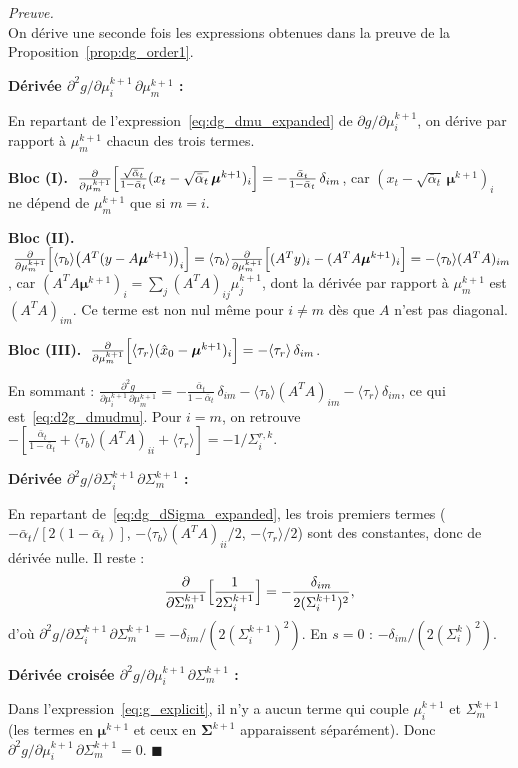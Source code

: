 \documentclass[12pt]{article}
\newcommand{\alt}{\bar\alpha_t}
\renewcommand{\qedsymbol}{$\blacksquare$}
\renewenvironment{proof}[1][\proofname]{%
  \par\medskip\noindent
  \textit{\color{proofgray}#1.}\enspace\ignorespaces
}{\hfill\qedsymbol\par\medskip}
\renewcommand{\proofname}{Preuve}
\begin{document}
\begin{proof}\\
On dérive une seconde fois les expressions obtenues dans la preuve de la Proposition~\ref{prop:dg_order1}.

\medskip
\textbf{Dérivée $\partial^2 g / \partial\mu_i^{k+1}\,\partial\mu_m^{k+1}$ :}

En repartant de l'expression~\eqref{eq:dg_dmu_expanded} de $\partial g/\partial\mu_i^{k+1}$, on dérive par rapport à $\mu_m^{k+1}$ chacun des trois termes.

\medskip

\textbf{Bloc (I).} $\;\frac{\partial}{\partial\mu_m^{k+1}}\Bigl[\frac{\sqrt{\alt}}{1-\alt}(x_t - \sqrt{\alt}\,\boldsymbol{\mu}^{k+1})_i\Bigr] = -\frac{\alt}{1-\alt}\,\delta_{im}$, car $(x_t - \sqrt{\alt}\,\boldsymbol{\mu}^{k+1})_i$ ne dépend de $\mu_m^{k+1}$ que si $m = i$.

\medskip

\textbf{Bloc (II).} $\;\frac{\partial}{\partial\mu_m^{k+1}}\Bigl[\langle\tau_b\rangle\bigl(A^T(y - A\boldsymbol{\mu}^{k+1})\bigr)_i\Bigr] = \langle\tau_b\rangle\frac{\partial}{\partial\mu_m^{k+1}}\Bigl[(A^Ty)_i - (A^TA\boldsymbol{\mu}^{k+1})_i\Bigr] = -\langle\tau_b\rangle(A^TA)_{im}$, car $(A^TA\boldsymbol{\mu}^{k+1})_i = \sum_j(A^TA)_{ij}\mu_j^{k+1}$, dont la dérivée par rapport à $\mu_m^{k+1}$ est $(A^TA)_{im}$. Ce terme est non nul même pour $i \neq m$ dès que $A$ n'est pas diagonal.

\medskip

\textbf{Bloc (III).} $\;\frac{\partial}{\partial\mu_m^{k+1}}\Bigl[\langle\tau_r\rangle(\hat{x}_0 - \boldsymbol{\mu}^{k+1})_i\Bigr] = -\langle\tau_r\rangle\,\delta_{im}$.

\medskip

En sommant : $\frac{\partial^2 g}{\partial\mu_i^{k+1}\,\partial\mu_m^{k+1}} = -\frac{\alt}{1-\alt}\,\delta_{im} - \langle\tau_b\rangle(A^TA)_{im} - \langle\tau_r\rangle\,\delta_{im}$, ce qui est~\eqref{eq:d2g_dmudmu}. Pour $i = m$, on retrouve $-[\frac{\alt}{1-\alt} + \langle\tau_b\rangle(A^TA)_{ii} + \langle\tau_r\rangle] = -1/\Sigma_i^{r,k}$.

\medskip
\textbf{Dérivée $\partial^2 g / \partial\Sigma_i^{k+1}\,\partial\Sigma_m^{k+1}$ :}

En repartant de~\eqref{eq:dg_dSigma_expanded}, les trois premiers termes ($-\alt/[2(1-\alt)]$, $-\langle\tau_b\rangle(A^TA)_{ii}/2$, $-\langle\tau_r\rangle/2$) sont des constantes, donc de dérivée nulle. Il reste :
\[
\frac{\partial}{\partial\Sigma_m^{k+1}}\Bigl[\frac{1}{2\Sigma_i^{k+1}}\Bigr] = -\frac{\delta_{im}}{2(\Sigma_i^{k+1})^2},
\]
d'où $\partial^2 g/\partial\Sigma_i^{k+1}\,\partial\Sigma_m^{k+1} = -\delta_{im}/(2(\Sigma_i^{k+1})^2)$. En $s=0$ : $-\delta_{im}/(2(\Sigma_i^k)^2)$.

\medskip
\textbf{Dérivée croisée $\partial^2 g / \partial\mu_i^{k+1}\,\partial\Sigma_m^{k+1}$ :}

Dans l'expression~\eqref{eq:g_explicit}, il n'y a aucun terme qui couple $\mu_i^{k+1}$ et $\Sigma_m^{k+1}$ (les termes en $\boldsymbol{\mu}^{k+1}$ et ceux en $\boldsymbol{\Sigma}^{k+1}$ apparaissent séparément). Donc $\partial^2 g/\partial\mu_i^{k+1}\,\partial\Sigma_m^{k+1} = 0$.
\end{proof}
\end{document}
